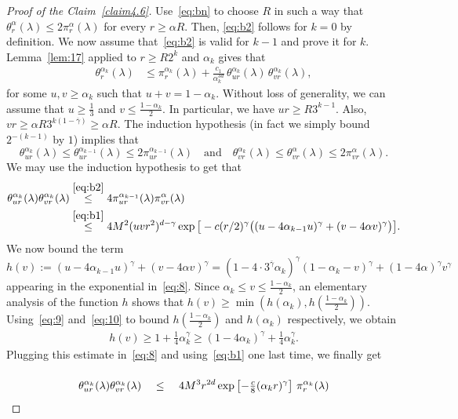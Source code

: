 \documentclass[10pt]{amsart}
\theoremstyle{definition}\newtheorem{defi}[theo]{Definition}\newtheorem{rema}[theo]{Remark}\newtheorem{exam}[theo]{Example}\newtheorem{exem}[theo]{Example}\newtheorem{nota}[theo]{Notation}
\begin{document}
\begin{proof}[{Proof of the Claim~\ref{claim4.6}}]
Use~\eqref{eq:bn} to choose $R$ in such a way that $\theta_r^{\alpha}(\lambda)\le 2\pi_r^\alpha(\lambda)$ for every $r\ge \alpha R$. Then, \eqref{eq:b2} follows for $k=0$ by definition. We now assume that~\eqref{eq:b2} is valid for $k-1$ and prove it for $k$. Lemma~\ref{lem:17} applied to $r\ge R2^k$ and $\alpha_k$ gives that
\begin{align}\label{eq:c1}
\theta_{r}^{\alpha_k}(\lambda)&\le \pi_{r}^{\alpha_k}(\lambda)+\frac{c_1}{\alpha_k^{3d}} \,\theta_{ur}^{\alpha_k}(\lambda)\,\theta_{vr}^{\alpha_k}(\lambda),
\end{align}
for some $u,v \ge\alpha_k$ such that $u+v=1-\alpha_k$. Without loss of generality, we can assume that $u \geq \frac 1 3$ and $v\le \frac{1-\alpha_k}2$. In particular, we have $ur\ge R3^{k-1}$. Also, $vr\ge \alpha R3^{k (1-\overline\gamma)}\ge \alpha R$. The induction hypothesis (in fact we simply bound $2^{-{(k-1)}}$ by $1$) implies that
\[
\theta_{ur}^{\alpha_k}(\lambda)\le \theta_{ur}^{\alpha_{k-1}}(\lambda)\le 2\pi_{ur}^{\alpha_{k-1}}(\lambda)\quad \text{and}\quad\theta_{vr}^{\alpha_k}(\lambda)\le \theta_{vr}^{\alpha}(\lambda)\le 2\pi_{vr}^\alpha(\lambda).
\]
We may use the induction hypothesis to get that
\begin{align}
\theta_{ur}^{\alpha_k}(\lambda)\theta_{vr}^{\alpha_k}(\lambda)&\stackrel{\eqref{eq:b2}}\le 4 \pi_{ur}^{\alpha_{k-1}}(\lambda)\pi_{vr}^\alpha(\lambda)\nonumber\\
& \stackrel{\eqref{eq:b1}}\leq 4 M^2 (uvr^2)^{d-\gamma} \exp \big[-c(r/2)^\gamma \big((u - 4\alpha_{k-1}u)^\gamma+(v -4 \alpha v)^\gamma\big)\big] \label{eq:8}
.
\end{align}
We now bound the term
\[
h(v):=(u - 4\alpha_{k-1}u)^\gamma+(v -4 \alpha v)^\gamma{=} (1 - 4\cdot 3^{\overline\gamma}\alpha_{k})^\gamma(1-\alpha_k-v)^\gamma+(1-4 \alpha)^\gamma v^\gamma
\]
appearing in the exponential in~\eqref{eq:8}. Since $\alpha_k\le v\le \frac{1-\alpha_k}2$, an elementary analysis of the function $h$ shows that $h(v) \ge \min (h(\alpha_k),h(\tfrac{1-\alpha_k}2))$. Using~\eqref{eq:9} and~\eqref{eq:10} to bound $h(\frac{1-\alpha_k}2)$ and $h(\alpha_k)$ respectively, we obtain
\begin{align*}
h(v)\ge 1+ \tfrac14 \alpha_k^\gamma \ge(1 - 4\alpha_k)^\gamma +\tfrac14 \alpha_k^\gamma.
\end{align*}
Plugging this estimate in~\eqref{eq:8} and using~\eqref{eq:b1} one last time, we finally get
\begin{align*}
\theta_{ur}^{\alpha_k}(\lambda)\theta_{vr}^{\alpha_k}(\lambda)& \stackrel{\phantom{\eqref{eq:b3}}}\leq 4M^3 r^{2d} \exp \left[-\tfrac c8 (\alpha_kr)^\gamma\right] \, \pi_r^{\alpha_k} (\lambda)\\

\end{align*}
\end{proof}
\end{document}
